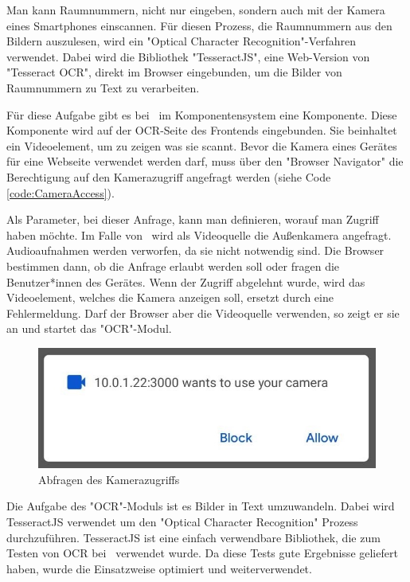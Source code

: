 
\label{sec:ocrmodul}

Man kann Raumnummern, nicht nur eingeben, sondern auch mit der Kamera eines Smartphones einscannen. Für diesen Prozess, die Raumnummern aus den Bildern auszulesen, wird ein "Optical Character Recognition"-Verfahren verwendet. Dabei wird die Bibliothek "TesseractJS", eine Web-Version von "Tesseract OCR", direkt im Browser eingebunden, um die Bilder von Raumnummern zu Text zu verarbeiten.\cite{TesseractJS}\cite{TesseractJSImplementation}

Für diese Aufgabe gibt es bei \ZELIA\ im Komponentensystem eine Komponente. Diese Komponente wird auf der OCR-Seite des Frontends eingebunden. Sie beinhaltet ein Videoelement, um zu zeigen was sie scannt. Bevor die Kamera eines Gerätes für eine Webseite verwendet werden darf, muss über den "Browser Navigator" die Berechtigung auf den Kamerazugriff angefragt werden (siehe Code \ref{code:CameraAccess}).


Als Parameter, bei dieser Anfrage, kann man definieren, worauf man Zugriff haben möchte. Im Falle von \ZELIA\ wird als Videoquelle die Außenkamera angefragt. Audioaufnahmen werden verworfen, da sie nicht notwendig sind. Die Browser bestimmen dann, ob die Anfrage erlaubt werden soll oder fragen die Benutzer*innen des Gerätes. Wenn der Zugriff abgelehnt wurde, wird das Videoelement, welches die Kamera anzeigen soll, ersetzt durch eine Fehlermeldung. Darf der Browser aber die Videoquelle verwenden, so zeigt er sie an und startet das "OCR"-Modul.

\begin{figure}[H]
    \centering
    \includegraphics[width=120mm]{media/OCR/cam_access_light.jpg}
    \caption{Abfragen des Kamerazugriffs}
\end{figure}


Die Aufgabe des "OCR"-Moduls ist es Bilder in Text umzuwandeln. Dabei wird TesseractJS verwendet um den "Optical Character Recognition" Prozess durchzuführen. TesseractJS ist eine einfach verwendbare Bibliothek, die zum Testen von OCR bei \ZELIA\ verwendet wurde. Da diese Tests gute Ergebnisse geliefert haben, wurde die Einsatzweise optimiert und weiterverwendet.

